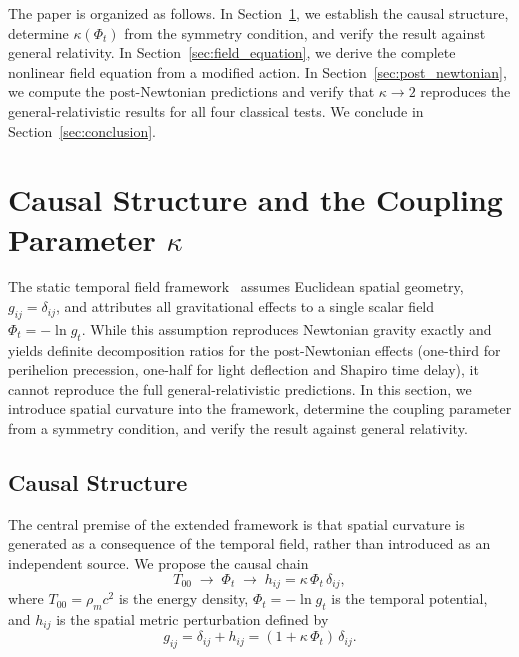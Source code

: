 \documentclass[12pt]{article}
\begin{document}
The paper is organized as follows. In Section~\ref{sec:causal_kappa}, we establish the causal structure, determine $\kappa(\Phi_t)$ from the symmetry condition, and verify the result against general relativity. In Section~\ref{sec:field_equation}, we derive the complete nonlinear field equation from a modified action. In Section~\ref{sec:post_newtonian}, we compute the post-Newtonian predictions and verify that $\kappa \to 2$ reproduces the general-relativistic results for all four classical tests. We conclude in Section~\ref{sec:conclusion}.


\section{Causal Structure and the Coupling Parameter $\kappa$}
\label{sec:causal_kappa}

The static temporal field framework~\cite{Gwak2026a} assumes Euclidean spatial geometry, $g_{ij} = \delta_{ij}$, and attributes all gravitational effects to a single scalar field $\Phi_t = -\ln g_t$. While this assumption reproduces Newtonian gravity exactly and yields definite decomposition ratios for the post-Newtonian effects (one-third for perihelion precession, one-half for light deflection and Shapiro time delay), it cannot reproduce the full general-relativistic predictions. In this section, we introduce spatial curvature into the framework, determine the coupling parameter from a symmetry condition, and verify the result against general relativity.

\subsection{Causal Structure}
\label{sec:causal}

The central premise of the extended framework is that spatial curvature is generated as a consequence of the temporal field, rather than introduced as an independent source. We propose the causal chain
\begin{equation}
T_{00} \;\longrightarrow\; \Phi_t \;\longrightarrow\; h_{ij} = \kappa\,\Phi_t\,\delta_{ij},
\label{eq:causal_chain}
\end{equation}
where $T_{00} = \rho_m c^2$ is the energy density, $\Phi_t = -\ln g_t$ is the temporal potential, and $h_{ij}$ is the spatial metric perturbation defined by
\begin{equation}
g_{ij} = \delta_{ij} + h_{ij} = (1 + \kappa\,\Phi_t)\,\delta_{ij}.
\label{eq:spatial_metric}
\end{equation}
\end{document}
